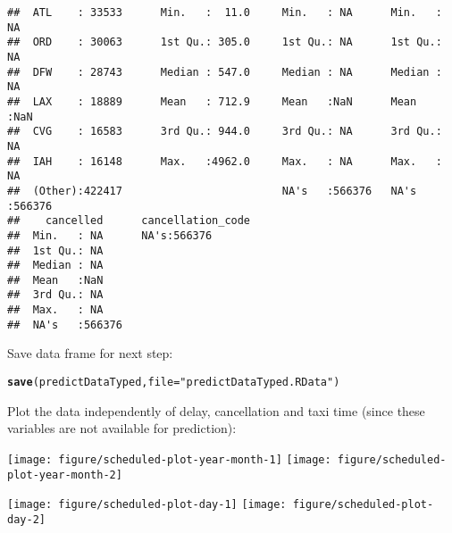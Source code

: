\documentclass{article}\usepackage[]{graphicx}\usepackage[]{color}
\makeatletter
\newcommand{\hlstr}[1]{\textcolor[rgb]{0.192,0.494,0.8}{#1}}%
\newcommand{\hlstd}[1]{\textcolor[rgb]{0.345,0.345,0.345}{#1}}%
\newcommand{\hlkwc}[1]{\textcolor[rgb]{0.333,0.667,0.333}{#1}}%
\newcommand{\hlkwd}[1]{\textcolor[rgb]{0.737,0.353,0.396}{\textbf{#1}}}%
\newenvironment{kframe}{%
 \def\at@end@of@kframe{}%
 \ifinner\ifhmode%
  \def\at@end@of@kframe{\end{minipage}}%
  \begin{minipage}{\columnwidth}%
 \fi\fi%
 \def\FrameCommand##1{\hskip\@totalleftmargin \hskip-\fboxsep
 \colorbox{shadecolor}{##1}\hskip-\fboxsep
     \hskip-\linewidth \hskip-\@totalleftmargin \hskip\columnwidth}%
 \MakeFramed {\advance\hsize-\width
   \@totalleftmargin\z@ \linewidth\hsize
   \@setminipage}}%
 {\par\unskip\endMakeFramed%
 \at@end@of@kframe}
\newenvironment{knitrout}{}{} %
\makeatother
\begin{document}
\begin{knitrout}
\begin{kframe}
\begin{verbatim}
##  ATL    : 33533      Min.   :  11.0     Min.   : NA      Min.   : NA     
##  ORD    : 30063      1st Qu.: 305.0     1st Qu.: NA      1st Qu.: NA     
##  DFW    : 28743      Median : 547.0     Median : NA      Median : NA     
##  LAX    : 18889      Mean   : 712.9     Mean   :NaN      Mean   :NaN     
##  CVG    : 16583      3rd Qu.: 944.0     3rd Qu.: NA      3rd Qu.: NA     
##  IAH    : 16148      Max.   :4962.0     Max.   : NA      Max.   : NA     
##  (Other):422417                         NA's   :566376   NA's   :566376  
##    cancelled      cancellation_code
##  Min.   : NA      NA's:566376      
##  1st Qu.: NA                       
##  Median : NA                       
##  Mean   :NaN                       
##  3rd Qu.: NA                       
##  Max.   : NA                       
##  NA's   :566376
\end{verbatim}
\end{kframe}
\end{knitrout}

Save data frame for next step:
\begin{knitrout}
\color{fgcolor}\begin{kframe}
\begin{alltt}
\hlkwd{save}\hlstd{(predictDataTyped,} \hlkwc{file}\hlstd{=}\hlstr{"predictDataTyped.RData"}\hlstd{)}
\end{alltt}
\end{kframe}
\end{knitrout}




Plot the data independently of delay, cancellation and taxi time (since these variables are not available for prediction):
  


\begin{knitrout}
\color{fgcolor}

{\centering \texttt{[image: figure/scheduled-plot-year-month-1]} 
\texttt{[image: figure/scheduled-plot-year-month-2]} 

}



\end{knitrout}

\begin{knitrout}
\color{fgcolor}

{\centering \texttt{[image: figure/scheduled-plot-day-1]} 
\texttt{[image: figure/scheduled-plot-day-2]} 

}



\end{knitrout}
\end{document}
